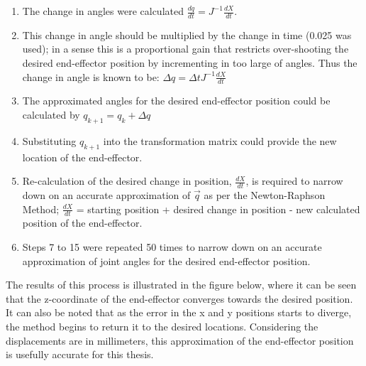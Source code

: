 \documentclass[12pt,openany,a4paper]{book}
\begin{document}
\begin{enumerate}
  \item The change in angles were calculated $\frac{dq}{dt} = J^{-1} \frac{dX}{dt}$.
  \item This change in angle should be multiplied by the change in time (0.025 was used); in a sense this is a proportional gain that restricts over-shooting the desired end-effector position by incrementing in too large of angles. Thus the change in angle is known to be: $\Delta q = \Delta t J^{-1} \frac{dX}{dt}$
  \item The approximated angles for the desired end-effector position could be calculated by $q_{k+1} = q_k + \Delta q$
  \item Substituting $q_{k+1}$ into the transformation matrix could provide the new location of the end-effector.
  \item Re-calculation of the desired change in position, $\frac{dX}{dt}$,  is required to narrow down on an accurate approximation of $\vec{q}$ as per the Newton-Raphson Method; $\frac{dX}{dt}$ = starting position + desired change in position - new calculated position of the end-effector.
  \item Steps 7 to 15 were repeated 50 times to narrow down on an accurate approximation of joint angles for the desired end-effector position.
\end{enumerate}

The results of this process is illustrated in the figure below, where it can be seen that the z-coordinate of the end-effector converges towards the desired position. It can also be noted that as the error in the x and y positions starts to diverge, the method begins to return it to the desired locations. Considering the displacements are in millimeters, this approximation of the end-effector position is usefully accurate for this thesis.
\end{document}

